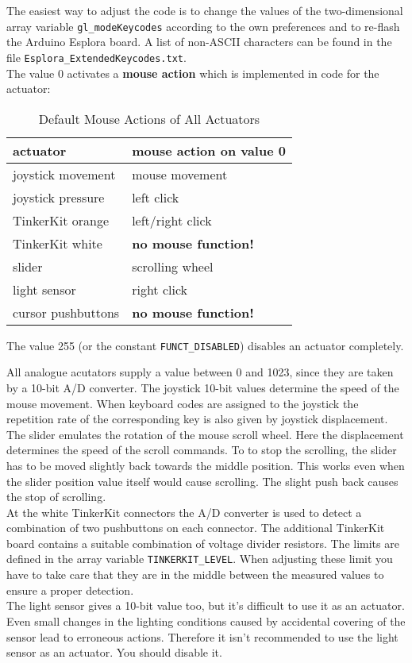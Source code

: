 The easiest way to adjust the code is to change the values of the
two-dimensional array variable \texttt{gl\_modeKeycodes} according to
the own preferences and to re-flash the Arduino Esplora board. A list of
non-ASCII characters can be found in the file
\texttt{Esplora\_ExtendedKeycodes.txt}.\\
The value 0 activates a \textbf{mouse action} which is implemented
in code for the actuator:
\begin{table}[h]
\centering
\renewcommand{\arraystretch}{1.5}
\begin{tabular}{|p{}|p{}|}
\hline
\textbf{actuator}		&	\textbf{mouse action on value 0}\\
\hline
	joystick movement	&	mouse movement\\
\hline
	joystick pressure	&	left click\\
\hline
	TinkerKit orange	&	left/right click\\
\hline
	TinkerKit white		&	\textbf{no mouse function!}\\
\hline
	slider				&	scrolling wheel\\
\hline
	light sensor		&	right click\\
\hline
	cursor pushbuttons	&	\textbf{no mouse function!}\\
\hline
\end{tabular}
\vspace{0.5cm}
\caption{Default Mouse Actions of All Actuators}
\end{table}

The value 255 (or the constant \texttt{FUNCT\_DISABLED}) disables an
actuator completely.

All analogue acutators supply a value between 0 and 1023, since they are
taken by a 10-bit A/D converter. The joystick 10-bit values determine
the speed of the mouse movement. When keyboard codes are assigned to the
joystick the repetition rate of the corresponding key is also given by 
joystick displacement.\\
The slider emulates the rotation of the mouse scroll wheel. Here the
displacement determines the speed of the scroll commands. To to stop the
scrolling, the slider has to be moved slightly back towards the middle
position. This works even when the slider position value itself would
cause scrolling. The slight push back causes the stop of scrolling.\\
At the white TinkerKit connectors the A/D converter is used to detect
a combination of two pushbuttons on each connector. The additional
TinkerKit board contains a suitable combination of voltage divider
resistors. The limits are defined in the array variable
\texttt{TINKERKIT\_LEVEL}. When adjusting these limit you have to take
care that they are in the middle between the measured values to ensure
a proper detection.\\
The light sensor gives a 10-bit value too, but it's difficult to use it
as an actuator. Even small changes in the lighting conditions caused by
accidental covering of the sensor lead to erroneous actions. Therefore
it isn't recommended to use the light sensor as an actuator. You should
disable it.


